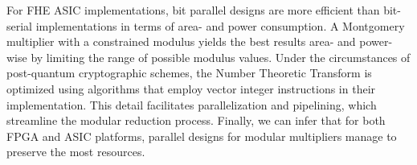 \documentclass[11pt,
  titlepage=false,
  abstract=on,
]{scrreprt}
\begin{document}
For FHE ASIC implementations, bit parallel designs are more efficient than bit-serial implementations in terms of area- and power consumption. A Montgomery multiplier 
with a constrained modulus yields the best results area- and power-wise by limiting the range of possible modulus values.
Under the circumstances of post-quantum cryptographic schemes, the Number Theoretic Transform is optimized using algorithms that employ vector integer instructions in
their implementation. This detail facilitates parallelization and pipelining, which streamline the modular reduction process.
Finally, we can infer that for both FPGA and ASIC platforms, parallel designs for modular multipliers manage to preserve the most resources.






\newpage
\printbibliography[heading=subbibliography]

% 
\end{document}
